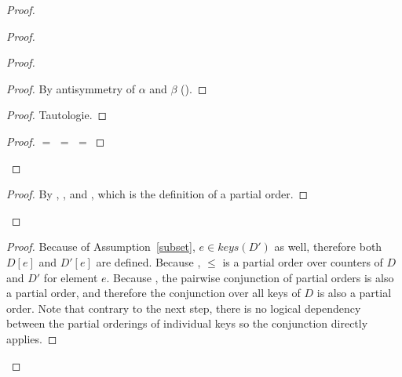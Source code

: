 \documentclass[9pt, oneside]{article}   	%
\begin{document}
\begin{proof}
\begin{proof}
\begin{proof}
				\begin{proof}
					By antisymmetry of $\alpha$ and $\beta$ ().
				\end{proof}
				
				\begin{proof}
					Tautologie.
				\end{proof}
				
				\qedstep
				\begin{proof}
					 $=$  $=$  $=$ 
				\end{proof}
			\end{proof}
			
			\qedstep
			\begin{proof}
				By , , and , which is the definition of a partial order.
			\end{proof}
		\end{proof}
			
			\begin{proof}
				Because of Assumption~\ref{subset}, $e \in \textit{keys}(D')$ as well, therefore both $D[e]$ and $D'[e]$ are defined. Because , $\leq$ is a partial order over counters of $D$ and $D'$ for element $e$. Because , the pairwise conjunction of partial orders is also a partial order, and therefore the conjunction over all keys of $D$ is also a partial order. Note that contrary to the next step, there is no logical dependency between the partial orderings of individual keys so the conjunction directly applies.
			\end{proof}
			

\end{proof}
\end{document}
